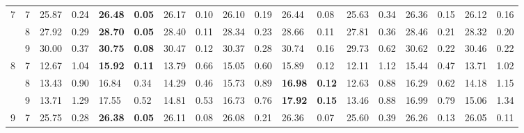 \documentclass[conference]{IEEEtran}
\begin{document}
\begin{table*}[]
\begin{tabular}{|cc|ll|ll|ll|ll|ll|ll|ll|ll|}
		\multicolumn{1}{|c|}{\multirow{3}{*}{7}} & 7 & \multicolumn{1}{l|}{25.87} & 0.24 & \multicolumn{1}{l|}{\textbf{26.48}} & \textbf{0.05} & \multicolumn{1}{l|}{26.17} & 0.10 & \multicolumn{1}{l|}{26.10} & 0.19 & \multicolumn{1}{l|}{26.44} & 0.08 & \multicolumn{1}{l|}{25.63} & 0.34 & \multicolumn{1}{l|}{26.36} & 0.15 & \multicolumn{1}{l|}{26.12} & 0.16 \\ \cline{2-18} 
		\multicolumn{1}{|c|}{} & 8 & \multicolumn{1}{l|}{27.92} & 0.29 & \multicolumn{1}{l|}{\textbf{28.70}} & \textbf{0.05} & \multicolumn{1}{l|}{28.40} & 0.11 & \multicolumn{1}{l|}{28.34} & 0.23 & \multicolumn{1}{l|}{28.66} & 0.11 & \multicolumn{1}{l|}{27.81} & 0.36 & \multicolumn{1}{l|}{28.46} & 0.21 & \multicolumn{1}{l|}{28.32} & 0.20 \\ \cline{2-18} 
		\multicolumn{1}{|c|}{} & 9 & \multicolumn{1}{l|}{30.00} & 0.37 & \multicolumn{1}{l|}{\textbf{30.75}} & \textbf{0.08} & \multicolumn{1}{l|}{30.47} & 0.12 & \multicolumn{1}{l|}{30.37} & 0.28 & \multicolumn{1}{l|}{30.74} & 0.16 & \multicolumn{1}{l|}{29.73} & 0.62 & \multicolumn{1}{l|}{30.62} & 0.22 & \multicolumn{1}{l|}{30.46} & 0.22 \\ \hline
		\multicolumn{1}{|c|}{\multirow{3}{*}{8}} & 7 & \multicolumn{1}{l|}{12.67} & 1.04 & \multicolumn{1}{l|}{\textbf{15.92}} & \textbf{0.11} & \multicolumn{1}{l|}{13.79} & 0.66 & \multicolumn{1}{l|}{15.05} & 0.60 & \multicolumn{1}{l|}{15.89} & 0.12 & \multicolumn{1}{l|}{12.11} & 1.12 & \multicolumn{1}{l|}{15.44} & 0.47 & \multicolumn{1}{l|}{13.71} & 1.02 \\ \cline{2-18} 
		\multicolumn{1}{|c|}{} & 8 & \multicolumn{1}{l|}{13.43} & 0.90 & \multicolumn{1}{l|}{16.84} & 0.34 & \multicolumn{1}{l|}{14.29} & 0.46 & \multicolumn{1}{l|}{15.73} & 0.89 & \multicolumn{1}{l|}{\textbf{16.98}} & \textbf{0.12} & \multicolumn{1}{l|}{12.63} & 0.88 & \multicolumn{1}{l|}{16.29} & 0.62 & \multicolumn{1}{l|}{14.18} & 1.15 \\ \cline{2-18} 
		\multicolumn{1}{|c|}{} & 9 & \multicolumn{1}{l|}{13.71} & 1.29 & \multicolumn{1}{l|}{17.55} & 0.52 & \multicolumn{1}{l|}{14.81} & 0.53 & \multicolumn{1}{l|}{16.73} & 0.76 & \multicolumn{1}{l|}{\textbf{17.92}} & \textbf{0.15} & \multicolumn{1}{l|}{13.46} & 0.88 & \multicolumn{1}{l|}{16.99} & 0.79 & \multicolumn{1}{l|}{15.06} & 1.34 \\ \hline
		\multicolumn{1}{|c|}{\multirow{3}{*}{9}} & 7 & \multicolumn{1}{l|}{25.75} & 0.28 & \multicolumn{1}{l|}{\textbf{26.38}} & \textbf{0.05} & \multicolumn{1}{l|}{26.11} & 0.08 & \multicolumn{1}{l|}{26.08} & 0.21 & \multicolumn{1}{l|}{26.36} & 0.07 & \multicolumn{1}{l|}{25.60} & 0.39 & \multicolumn{1}{l|}{26.26} & 0.13 & \multicolumn{1}{l|}{26.05} & 0.11 \\ \cline{2-18} 

\end{tabular}
\end{table*}
\end{document}

